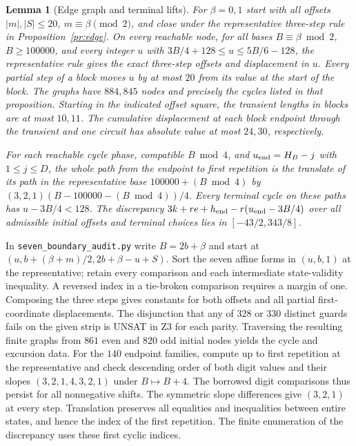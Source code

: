 \documentclass[11pt,reqno]{amsart}
\newtheorem{lemma}{Lemma}[section]
\begin{document}
\begin{lemma}[Edge graph and terminal lifts]\label{l:edge}
For $\beta=0,1$ start with all offsets $|m|,|S|\le20$,
$m\equiv\beta\pmod2$, and close under the representative three-step rule
in Proposition~\ref{pr:edge}. On every reachable node, for all bases
$B\equiv\beta\bmod2$, $B\ge100000$, and every integer $u$ with
$3B/4+128\le u\le5B/6-128$, the representative rule gives the exact
three-step offsets and displacement in $u$. Every partial step of a block
moves $u$ by at most $20$ from its value at the start of the block.
The graphs have $884,845$ nodes and precisely the cycles listed in that
proposition. Starting in the indicated offset square, the transient lengths
in blocks are at most $10,11$. The cumulative displacement at each
block endpoint through the transient and one circuit has absolute value
at most $24,30$, respectively.

For each reachable cycle phase, compatible $B\bmod4$, and
$u_{\rm end}=H_B-j$ with $1\le j\le D$, the whole path from the endpoint
to first repetition is the translate of its path in the representative
base $100000+(B\bmod4)$ by $(3,2,1)(B-100000-(B\bmod4))/4$.
Every terminal cycle on these paths has $u-3B/4<128$. The discrepancy
$3k+re+h_{\rm end}-r(u_{\rm end}-3B/4)$ over all admissible initial
offsets and terminal choices lies in $[-43/2,343/8]$.
\end{lemma}
\noindent
In \texttt{seven\_boundary\_audit.py} write $B=2b+\beta$ and start at
$(u,b+(\beta+m)/2,2b+\beta-u+S)$. Sort the seven affine forms in
$(u,b,1)$ at the representative; retain every comparison and each
intermediate state-validity inequality. A reversed index in a tie-broken
comparison requires a margin of one. Composing the three steps gives
constants for both offsets and all partial first-coordinate displacements.
The disjunction that any of $328$ or $330$ distinct guards fails on the
given strip is UNSAT in Z3 for each parity. Traversing the resulting finite
graphs from $861$ even and $820$ odd initial nodes yields the cycle and
excursion data. For the $140$ endpoint families, compute up to first
repetition at the representative and check descending order of both digit
values and their slopes $(3,2,1,4,3,2,1)$ under $B\mapsto B+4$. The
borrowed digit comparisons thus persist for all nonnegative shifts.
The symmetric slope differences give $(3,2,1)$ at every step. Translation
preserves all equalities and inequalities between entire states, and hence
the index of the first repetition. The finite enumeration of the discrepancy
uses these first cyclic indices.
\end{document}
